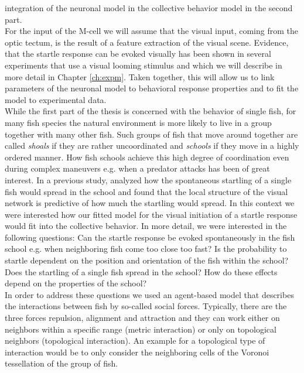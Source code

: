 	integration of the neuronal model in the collective behavior model in the second part.\\
	For the input of the M-cell we will assume that the visual input, coming from the optic tectum, 
	is the result of a feature extraction of the visual scene.
    Evidence, that the startle response can be evoked visually has been shown in several experiments that use a visual looming stimulus and which we will describe in more detail in Chapter \ref{ch:expm}.
	Taken together, this will allow us to link parameters of the neuronal model to behavioral 
	response properties and to fit the model to experimental data.\\
	While the first part of the thesis is concerned with the behavior of single fish, for many fish species the natural environment is more likely to live in a group together with many other fish.
	Such groups of fish that move around together are called \textit{shoals} if they are rather uncoordinated and \textit{schools} if they move in a highly ordered manner.
    How fish schools achieve this high degree of coordination even during complex maneuvers e.g. when a predator attacks has been of great interest.
    In a previous study, \cite{Rosenthal2015} analyzed how the spontaneous startling of a single fish would spread in the school and found that the local structure of the visual network is predictive of how much the startling would spread.
    In this context we were interested how our fitted model for the visual initiation of a startle response would fit into the collective behavior.
	In more detail, we were interested in the following questions:
	Can the startle response be evoked spontaneously in the fish school e.g. when neighboring fish 
	come too close too fast?
    Is the probability to startle dependent on the position and orientation of the fish within the school?
	Does the startling of a single fish spread in the school?
	How do these effects depend on the properties of the school?\\
	In order to address these questions we used an agent-based model that describes the 
	interactions between fish by so-called social forces.
	Typically, there are the three forces repulsion, alignment and attraction and they can work 
	either on neighbors within a specific range (metric interaction) or only on topological 
	neighbors (topological interaction).
	An example for a topological type of interaction would be to only consider the neighboring 
	cells of the Voronoi tessellation of the group of fish.
